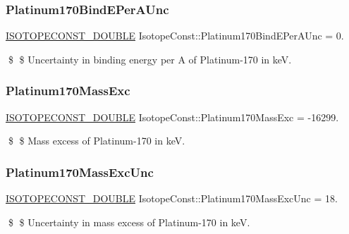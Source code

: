 \subsubsection{\texorpdfstring{Platinum170\+Bind\+E\+Per\+A\+Unc}{Platinum170BindEPerAUnc}}
{\footnotesize\ttfamily \mbox{\hyperlink{group___isotope_const-_macros_ga8f45a7272ce02c0b4c65c44636ed719a}{I\+S\+O\+T\+O\+P\+E\+C\+O\+N\+S\+T\+\_\+\+D\+O\+U\+B\+LE}} Isotope\+Const\+::\+Platinum170\+Bind\+E\+Per\+A\+Unc = 0.}

\$ \$ Uncertainty in binding energy per A of Platinum-\/170 in keV. \mbox{\label{group___isotope_const-_platinum-_pt170_ga387a73e697b3529832a3a5aefbba6c31}} 
\subsubsection{\texorpdfstring{Platinum170\+Mass\+Exc}{Platinum170MassExc}}
{\footnotesize\ttfamily \mbox{\hyperlink{group___isotope_const-_macros_ga8f45a7272ce02c0b4c65c44636ed719a}{I\+S\+O\+T\+O\+P\+E\+C\+O\+N\+S\+T\+\_\+\+D\+O\+U\+B\+LE}} Isotope\+Const\+::\+Platinum170\+Mass\+Exc = -\/16299.}

\$ \$ Mass excess of Platinum-\/170 in keV. \mbox{\label{group___isotope_const-_platinum-_pt170_gac7a87927344b81757c54fe0cf9bcbc0a}} 
\subsubsection{\texorpdfstring{Platinum170\+Mass\+Exc\+Unc}{Platinum170MassExcUnc}}
{\footnotesize\ttfamily \mbox{\hyperlink{group___isotope_const-_macros_ga8f45a7272ce02c0b4c65c44636ed719a}{I\+S\+O\+T\+O\+P\+E\+C\+O\+N\+S\+T\+\_\+\+D\+O\+U\+B\+LE}} Isotope\+Const\+::\+Platinum170\+Mass\+Exc\+Unc = 18.}

\$ \$ Uncertainty in mass excess of Platinum-\/170 in keV. \mbox{\label{group___isotope_const-_platinum-_pt170_gab9f95ad3ecddb655bff523ab49f9ce59}} 
